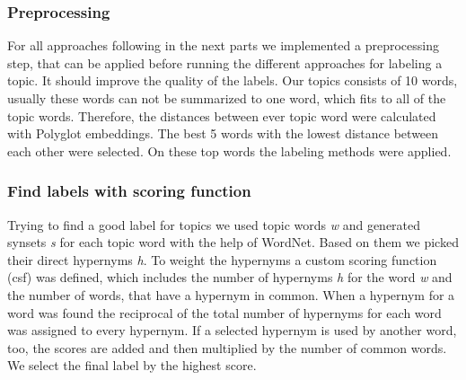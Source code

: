 \subsubsection{Preprocessing}
For all approaches following in the next parts we implemented a preprocessing step, that can be applied before running the different approaches for labeling a topic. It should improve the quality of the labels. 
Our topics consists of 10 words, usually these words can not be summarized to one word, which fits to all of the topic words. Therefore, the distances between ever topic word were calculated with Polyglot embeddings. The best 5 words with the lowest distance between each other were selected. On these top words the labeling methods were applied.

\subsubsection{Find labels with scoring function}
Trying to find a good label for topics we used topic words \textit{w} and generated synsets \textit{s} for each topic word with the help of WordNet. Based on them we picked their direct hypernyms \textit{h}. To weight the hypernyms a custom scoring function (csf) was defined, which includes the number of hypernyms \textit{h} for the word \textit{w} and the number of words, that have a hypernym in common. When a hypernym for a word was found the reciprocal of the total number of hypernyms for each word was assigned to every hypernym. If a selected hypernym is used by another word, too, the scores are added and then multiplied by the number of common words. We select the final label by the highest score.

